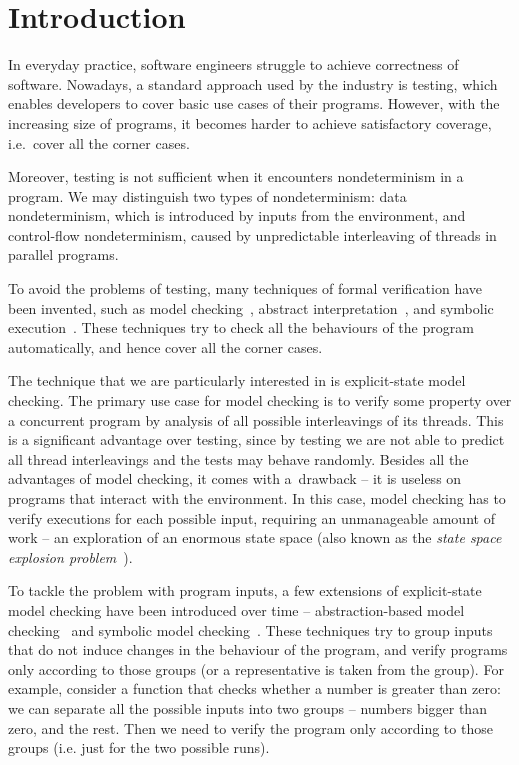 \chapter{Introduction}\label{ch:Introduction}

\noindent
In everyday practice, software engineers struggle to achieve correctness of
software. Nowadays, a standard approach used by the industry is testing, which
enables developers to cover basic use cases of their programs. However, with the
increasing size of programs, it becomes harder to achieve satisfactory
coverage, i.e.~cover all the corner cases.

Moreover, testing is not sufficient when it encounters nondeterminism in a
program. We may distinguish two types of nondeterminism: data nondeterminism,
which is introduced by inputs from the environment, and control-flow
nondeterminism, caused by unpredictable interleaving of threads in parallel
programs.

To avoid the problems of testing, many techniques of formal verification have
been invented, such as model checking~\cite{Baier08}, abstract
interpretation~\cite{Cousot14}, and symbolic execution~\cite{King76}.
These techniques try to check all the behaviours of the program automatically,
and hence cover all the corner cases.

The technique that we are particularly interested in is explicit-state model
checking. The primary use case for model checking is to
verify some property over a concurrent program by analysis of all
possible interleavings of its threads. This is a significant advantage
over testing, since by testing we are not able to predict all thread
interleavings and the tests may behave randomly. Besides all
the advantages of model checking, it comes with a~drawback -- it is
useless on programs that interact with the environment. In this case,
model checking has to verify executions for each possible input,
requiring an unmanageable amount of work -- an exploration of an enormous
state space (also known as the \emph{state space explosion
problem}~\cite{Clarke99}).

To tackle the problem with program inputs, a few extensions of explicit-state
model checking have been introduced over time -- abstraction-based model
checking~\cite{Clarke94} and symbolic model checking~\cite{Clarke96}. These
techniques try to group inputs that do not induce changes in the behaviour of
the program, and verify programs only according to those groups (or a
representative is taken from the group). For example, consider a function
that checks whether a number is greater than zero: we can separate all the
possible inputs into two groups -- numbers bigger than zero, and the rest. Then
we need to verify the program only according to those groups (i.e. just for the
two possible runs).

